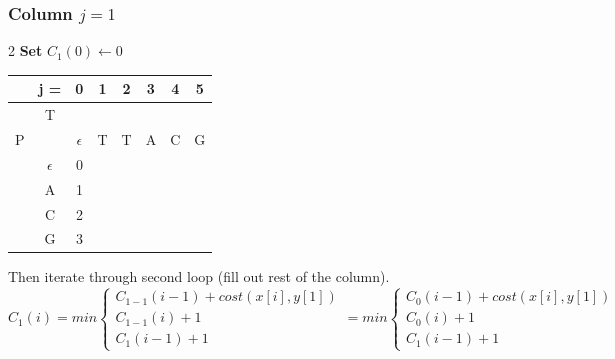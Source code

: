 \subsubsection*{Column $j = 1$}
\begin{multicols}{2}
    \textbf{Set} $C_1(0) \gets 0$

    \begin{center}
        \begin{tabular}{|c c|c|c|c|c|c|c|} \hline
        &   j =  &  0           &   1   &   2   &   3   &   4   &   5   \\ \hline
        &   T    &              &       &       &       &       &       \\
        P   &        &  $\epsilon$  &   T   &   T   &   A   &   C   &   G   \\ \hline
        & $\epsilon$ &       0      &\ccr0  &       &       &       &       \\ \hline
        &    A   &     1        &       &       &       &       &       \\ \hline
        &    C   & 2            &       &       &       &       &       \\ \hline
        &    G   & 3            &       &       &       &       &       \\ \hline
        \end{tabular}
    \end{center}
\end{multicols}

Then iterate through second loop (fill out rest of the column).
\[
    C_1(i) = min \begin{cases}
                     C_{1-1}(i-1) + cost(x[i], y[1]) \\
                     C_{1-1}(i) + 1 \\
                     C_1(i-1) + 1
    \end{cases} =  min \begin{cases}
                           C_{0}(i-1) + cost(x[i], y[1]) \\
                           C_{0}(i) + 1 \\
                           C_1(i-1) + 1
    \end{cases}
\]

